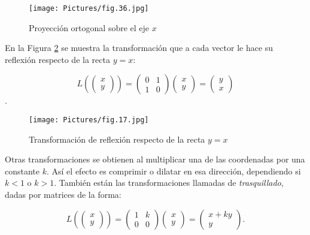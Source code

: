 \begin{figure}
    \centering
    \texttt{[image: Pictures/fig.36.jpg]}
    \caption{Proyección ortogonal sobre el eje $x$ }
    \label{fig36}
\end{figure}



\begin{example}
 En la Figura \ref{TLfig77} se muestra la transformación que a cada vector le hace su reflexión  respecto de la recta  $y=x$:

 $$L  \left( \left(  \begin{array}{c} x  \\ y  \end{array}    \right) \right )= \left(   \begin{array}{cc} 0 & 1 \\ 1 & 0   \end{array} \right ) \left( \begin{array}{c} x  \\ y  \end{array} \right )     =\left(   \begin{array}{c} y   \\ x  \end{array} \right )$$ .
\end{example}
\begin{figure}
    \centering
    \texttt{[image: Pictures/fig.17.jpg]}
    \caption{Transformación de reflexión respecto de la recta $y=x$ }
    \label{TLfig77}
\end{figure}

\bigskip

\begin{remark}
 Otras  transformaciones se obtienen al multiplicar una de las  coordenadas por una constante $k$. Así el efecto es comprimir o dilatar en esa dirección, dependiendo si $k < 1$ o $k > 1$. También están las transformaciones llamadas de \textit{trasquillado}, dadas por matrices de la forma:

 $$L  \left( \left( \begin{array}{c} x  \\ y  \end{array}    \right) \right )= \left(   \begin{array}{cc} 1 & k \\ 0 &  0   \end{array} \right ) \left( \begin{array}{c} x  \\ y  \end{array} \right )     =\left(   \begin{array}{c} x+ky   \\ y  \end{array} \right ).$$
\end{remark}

